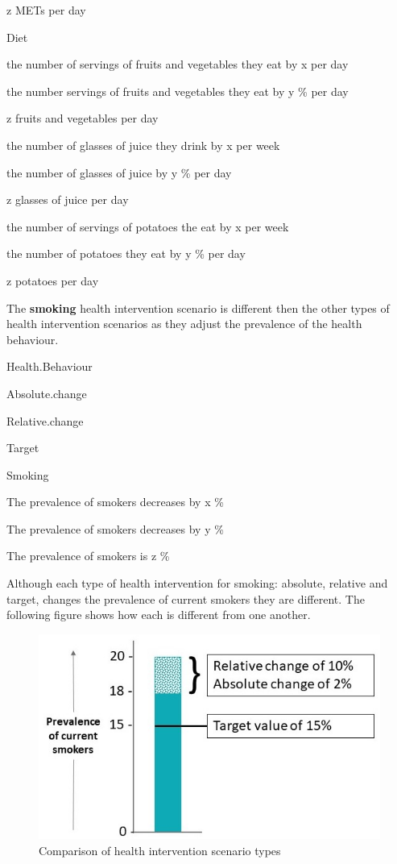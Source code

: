 \documentclass[]{book}
\begin{document}
z METs per day

Diet

the number of servings of fruits and vegetables they eat by x per day

the number servings of fruits and vegetables they eat by y \% per day

z fruits and vegetables per day

the number of glasses of juice they drink by x per week

the number of glasses of juice by y \% per day

z glasses of juice per day

the number of servings of potatoes the eat by x per week

the number of potatoes they eat by y \% per day

z potatoes per day

The \textbf{smoking} health intervention scenario is different then the
other types of health intervention scenarios as they adjust the
prevalence of the health behaviour.

Health.Behaviour

Absolute.change

Relative.change

Target

Smoking

The prevalence of smokers decreases by x \%

The prevalence of smokers decreases by y \%

The prevalence of smokers is z \%

Although each type of health intervention for smoking: absolute,
relative and target, changes the prevalence of current smokers they are
different. The following figure shows how each is different from one
another.

\begin{figure}

{\centering \includegraphics{Images/Scenario-Abs, Rel, Target cropped} 

}

\caption{Comparison of health intervention scenario types}\label{fig:unnamed-chunk-12}
\end{figure}
\end{document}
